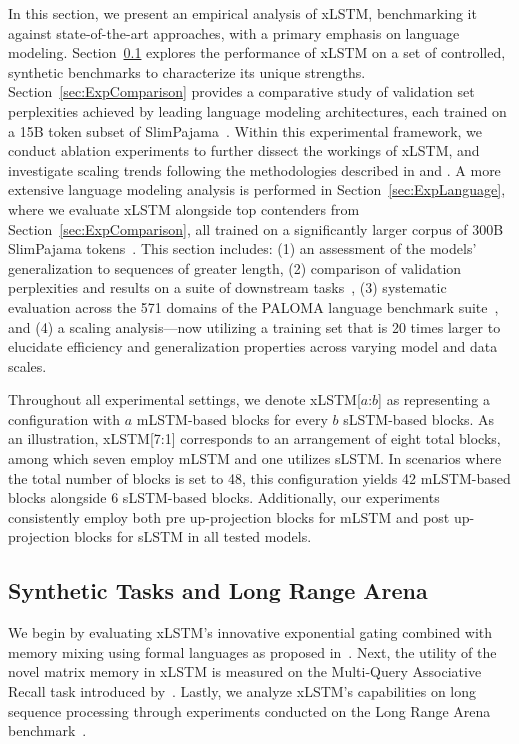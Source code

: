 In this section, we present an empirical analysis of xLSTM, benchmarking it against state-of-the-art approaches, with a primary emphasis on language modeling. Section~\ref{sec:ExpSyntethic} explores the performance of xLSTM on a set of controlled, synthetic benchmarks to characterize its unique strengths. 
Section~\ref{sec:ExpComparison} provides a comparative study of validation set perplexities achieved by leading language modeling architectures, each trained on a 15B token subset of SlimPajama~\citep{Soboleva:23}. Within this experimental framework, we conduct ablation experiments to further dissect the workings of xLSTM, and investigate scaling trends following the methodologies described in \citet{Kaplan:20} and \citet{Brown:20short}. 
A more extensive language modeling analysis is performed in Section~\ref{sec:ExpLanguage}, 
where we evaluate xLSTM alongside top contenders from Section~\ref{sec:ExpComparison}, all trained on a significantly larger corpus of 300B SlimPajama tokens~\citep{Soboleva:23}. This section includes: (1) an assessment of the models' generalization to sequences of greater length, (2) comparison of validation perplexities and results on a suite of downstream tasks~\citep{Sutawika:24}, (3) systematic evaluation across the 571 domains of the PALOMA language benchmark suite~\citep{Magnusson:23arxivshort}, and (4) a scaling analysis—now utilizing a training set that is 20 times larger to elucidate efficiency and generalization properties across varying model and data scales.

\label{sec:xlstm_blocks_notation}
Throughout all experimental settings, we denote xLSTM[$a$:$b$] as representing a configuration with $a$ mLSTM-based blocks for every $b$ sLSTM-based blocks. As an illustration, xLSTM[7:1] corresponds to an arrangement of eight total blocks, among which seven employ mLSTM and one utilizes sLSTM. In scenarios where the total number of blocks is set to 48, this configuration yields 42 mLSTM-based blocks alongside 6 sLSTM-based blocks. Additionally, our experiments consistently employ both pre up-projection blocks for mLSTM and post up-projection blocks for sLSTM in all tested models.

\subsection{Synthetic Tasks and Long Range Arena}
\label{sec:ExpSyntethic}
We begin by evaluating xLSTM’s innovative exponential gating combined with memory mixing using formal languages as proposed in~\citep{Deletang:23}. Next, the utility of the novel matrix memory in xLSTM is measured on the Multi-Query Associative Recall task introduced by~\citep{Arora:23arxiv}. Lastly, we analyze xLSTM’s capabilities on long sequence processing through experiments conducted on the Long Range Arena benchmark~\citep{Tay:21}.

